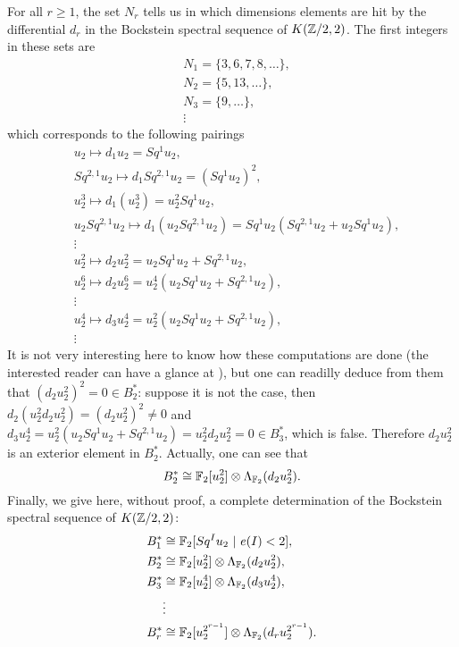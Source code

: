 For all $r\geq1$, the set $N_r$ tells us in which dimensions elements are hit by the differential $d_r$ in the Bockstein spectral sequence of $K(\mathbb{Z}/2,2)$. The first integers in these sets are
\begin{align*}
&N_1=\{3,6,7,8,\dots\},\\
&N_2=\{5,13,\dots\},\\
&N_3=\{9,\dots\},\\
&\vdots
\end{align*}
which corresponds to the following pairings
\begin{align*}
&u_2\mapsto d_1u_2=Sq^1u_2, \\
&Sq^{2,1}u_2\mapsto d_1Sq^{2,1}u_2=(Sq^1u_2)^2,\\
&u_2^3\mapsto d_1(u_2^3)=u_2^2Sq^1u_2,\\ 
&u_2Sq^{2,1}u_2\mapsto d_1(u_2Sq^{2,1}u_2)=Sq^1u_2(Sq^{2,1}u_2+u_2Sq^1u_2),\\
&\vdots\\
&u_2^2\mapsto d_2u_2^2=u_2Sq^1u_2+Sq^{2,1}u_2,\\
&u_2^6\mapsto d_2u_2^6=u_2^4(u_2Sq^1u_2+Sq^{2,1}u_2),\\
&\vdots\\
&u_2^4\mapsto d_3u_2^4=u_2^2(u_2Sq^1u_2+Sq^{2,1}u_2),\\
&\vdots
\end{align*}
It is not very interesting here to know how these computations are done (the interested reader can have a glance at \cite[Theorem 5.4]{Br61}), but one can readilly deduce from them that $(d_2u_2^2)^2=0\in B_2^*$: suppose it is not the case, then $d_2(u_2^2d_2u_2^2)=(d_2u_2^2)^2\not=0$ and  $d_3u_2^4=u_2^2(u_2Sq^1u_2+Sq^{2,1}u_2)=u_2^2d_2u_2^2=0\in B_3^*$, which is false. Therefore $d_2u_2^2$ is an exterior element in $B_2^*$. Actually, one can see that 
$$
B_2^*\cong\mathbb{F}_2[u_2^2]\otimes\Lambda_{\mathbb{F}_2}(d_2u_2^2).
$$
Finally, we give here, without proof, a complete determination of the Bockstein spectral sequence of $K(\mathbb{Z}/2,2)$:
\begin{align*}
B_1^* &\cong\mathbb{F}_2[Sq^I u_2\ |\ e(I)<2 ],\\
B_2^* &\cong\mathbb{F}_2[u_2^2]\otimes\Lambda_{\mathbb{F}_2}(d_2u_2^2),\\
B_3^* &\cong\mathbb{F}_2[u_2^4]\otimes\Lambda_{\mathbb{F}_2}(d_3u_2^4),\\
&\vdots\\
B_r^* &\cong\mathbb{F}_2[u_2^{2^{r-1}}]\otimes\Lambda_{\mathbb{F}_2}(d_r u_2^{2^{r-1}}).
\end{align*}

\endinput
\begin{lem}\label{l:N_r}
For all $r\geq2$ we have
\begin{align*}
&2^{r+1},2^{r+1}+1\not\in\bigcup_{2\leq s\leq r}N_s.
\end{align*}
\end{lem}

